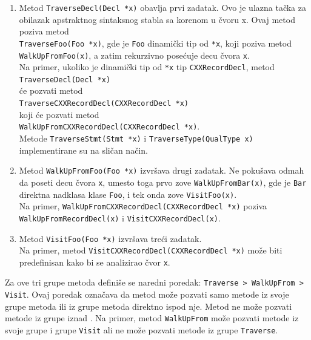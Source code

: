 \documentclass[12pt,oneside]{memoir}
\begin{document}
\begin{enumerate}
  \item Metod \texttt{TraverseDecl(Decl *x)} obavlja prvi zadatak. Ovo je ulazna tačka za obilazak apstraktnog sintaksnog stabla sa korenom u čvoru x. Ovaj metod poziva metod \\ \texttt{TraverseFoo(Foo *x)}, gde je \texttt{Foo} dinamički tip od \texttt{*x}, koji poziva metod \\ \texttt{WalkUpFromFoo(x)}, a zatim rekurzivno posećuje decu čvora \texttt{x}. \\
  Na primer, ukoliko je dinami\v{c}ki tip od \texttt{*x} tip \texttt{CXXRecordDecl}, metod \\ \texttt{TraverseDecl(Decl *x)} \\ \'{c}e pozvati metod \\ \texttt{TraverseCXXRecordDecl(CXXRecordDecl *x)} \\ koji \'{c}e pozvati metod \\ \texttt{WalkUpFromCXXRecordDecl(CXXRecordDecl *x)}. \\ Metode \texttt{TraverseStmt(Stmt *x)} i \texttt{TraverseType(QualType x)} implementirane su na sličan način.
 
\item Metod \texttt{WalkUpFromFoo(Foo *x)} izvršava drugi zadatak. Ne pokušava odmah da poseti decu čvora \texttt{x}, umesto toga prvo zove \texttt{WalkUpFromBar(x)}, gde je \texttt{Bar} direktna nadklasa klase \texttt{Foo}, i tek onda zove \texttt{VisitFoo(x)}. \\
Na primer, \texttt{WalkUpFromCXXRecordDecl(CXXRecordDecl *x)} poziva \\ \texttt{WalkUpFromRecordDecl(x)} i \texttt{VisitCXXRecordDecl(x)}.
\item Metod \texttt{VisitFoo(Foo *x)} izvršava tre\'{c}i zadatak. \\Na primer, metod \texttt{VisitCXXRecordDecl(CXXRecordDecl *x)} mo\v{z}e biti predefinisan kako bi se analizirao \v{c}vor \texttt{x}.
\end{enumerate}
Za ove tri grupe metoda defini\v{s}e se naredni poredak: \texttt{Traverse > WalkUpFrom > Visit}. Ovaj poredak ozna\v{c}ava da metod mo\v{z}e pozvati samo metode iz svoje grupe metoda ili iz grupe metoda direktno ispod nje. Metod ne mo\v{z}e pozvati metode iz grupe iznad \cite{visitors}. Na primer, metod \texttt{WalkUpFrom} mo\v{z}e pozvati metode iz svoje grupe i grupe \texttt{Visit} ali 
ne mo\v{z}e pozvati metode iz grupe \texttt{Traverse}.
\end{document}
